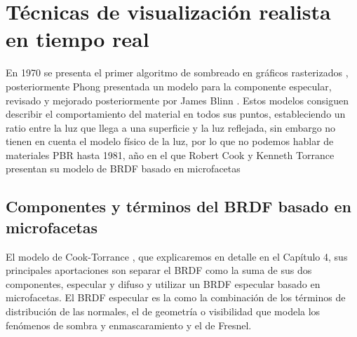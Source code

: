 
\section{T\'ecnicas de visualizaci\'on realista en tiempo real}

En 1970 se presenta el primer algoritmo de sombreado en gr\'aficos rasterizados \autocite{gouraud}, posteriormente 
Phong \autocite{phong} presentada un modelo para la componente especular, revisado y mejorado posteriormente por James Blinn
\autocite{blinnphong}. Estos modelos consiguen describir el comportamiento del material en todos sus puntos,
estableciendo un ratio entre la luz que llega a una superficie y la luz reflejada, sin embargo no tienen en cuenta el modelo f\'isico de
la luz, por lo que no podemos hablar de materiales PBR hasta 1981, a\~no en el que Robert Cook y Kenneth Torrance presentan su modelo
de BRDF basado en microfacetas \autocite{cooktorrance}

    \subsection{Componentes y t\'erminos del BRDF basado en microfacetas}

    El modelo de Cook-Torrance \autocite{cooktorrance}, que explicaremos en detalle en el Cap\'itulo 4, sus principales aportaciones son
    separar el BRDF como la suma de sus dos componentes, especular y difuso y utilizar un BRDF especular basado en microfacetas. El BRDF
    especular es la como la combinaci\'on de los t\'erminos de distribuci\'on de las normales, el de geometr\'ia o visibilidad que modela
    los fen\'omenos de sombra y enmascaramiento y el de Fresnel.

